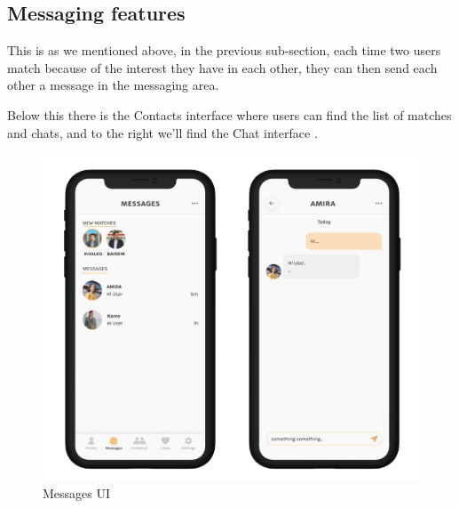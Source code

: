 \subsection{Messaging features}
This is as we mentioned above, in the previous sub-section, each time two users match because of the interest they have in each other, they can then send each other a message in the messaging area.

Below this there is the Contacts interface where users can find the list of matches and chats, and to the right we'll find the Chat interface .
\begin{figure}[H] 
            \centering
            \includegraphics[scale=0.2]{messages ui.png}
            \caption{Messages UI} 
            \label{fig: messages UI}
\end{figure}
